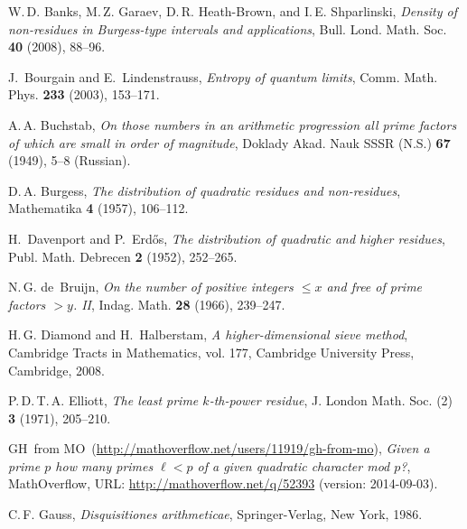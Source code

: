 \documentclass{scrartcl}
\theoremstyle{plain}
\theoremstyle{remark}
\newcommand{\1}{\mathbf{1}}
\begin{document}
{\small 
\providecommand{\bysame}{\leavevmode\hbox to3em{\hrulefill}\thinspace}
\providecommand{\MR}{\relax\ifhmode\unskip\space\fi MR }
\providecommand{\MRhref}[2]{%
  \href{http://www.ams.org/mathscinet-getitem?mr=#1}{#2}
}
\providecommand{\href}[2]{#2}
\begin{thebibliography}{10}

{W.\,D}. Banks, {M.\,Z.} Garaev, {D.\,R.} Heath-Brown, and {I.\,E.}
  Shparlinski, \emph{Density of non-residues in {B}urgess-type intervals and
  applications}, Bull. Lond. Math. Soc. \textbf{40} (2008), 88--96.

J.~Bourgain and E.~Lindenstrauss, \emph{Entropy of quantum limits}, Comm. Math.
  Phys. \textbf{233} (2003), 153--171.

{A.\,A.} Buchstab, \emph{On those numbers in an arithmetic progression all
  prime factors of which are small in order of magnitude}, Doklady Akad. Nauk
  SSSR (N.S.) \textbf{67} (1949), 5--8 (Russian).

{D.\,A.} Burgess, \emph{The distribution of quadratic residues and
  non-residues}, Mathematika \textbf{4} (1957), 106--112.

H.~Davenport and P.~Erd\H{o}s, \emph{The distribution of quadratic and higher
  residues}, Publ. Math. Debrecen \textbf{2} (1952), 252--265.

{N.\,G.} de~Bruijn, \emph{On the number of positive integers {$\leq x$} and
  free of prime factors {$>y$}. {II}}, Indag. Math. \textbf{28} (1966),
  239--247.

{H.\,G.} Diamond and H.~Halberstam, \emph{A higher-dimensional sieve method},
  Cambridge Tracts in Mathematics, vol. 177, Cambridge University Press,
  Cambridge, 2008.

{P.\,D.\,T.\,A.} Elliott, \emph{The least prime {$k$-th}-power residue}, J.
  London Math. Soc. (2) \textbf{3} (1971), 205--210.

GH~from MO~(\url{http://mathoverflow.net/users/11919/gh-from-mo}), \emph{Given
  a prime $p$ how many primes $\ell < p$ of a given quadratic character mod
  $p$?}, MathOverflow, URL: \url{http://mathoverflow.net/q/52393} (version:
  2014-09-03).

{C.\,F.} Gauss, \emph{Disquisitiones arithmeticae}, Springer-Verlag, New York,
  1986.


\end{thebibliography}}
\end{document}
